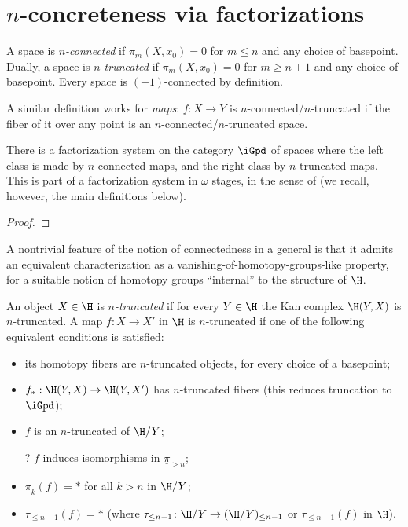 \documentclass[12pt]{amsart}
\begin{document}
\section{$n$-concreteness via factorizations}
\begin{definition}
A space is \emph{$n$-connected} if $\pi_m(X,x_0) = 0$ for $m\le n$ and any choice of basepoint. Dually, a space is \emph{$n$-truncated} if $\pi_m(X,x_0) = 0$ for $m\ge n+1$ and any choice of basepoint. Every space is $(-1)$-connected by definition.

A similar definition works for \emph{maps}: $f \colon X \to Y$ is $n$-connected\fshyp{}$n$-truncated if the fiber of it over any point is an $n$-connected\fshyp{}$n$-truncated space.
\end{definition}
\begin{proposition}
There is a factorization system on the category $\iGpd$ of spaces where the left class is made by $n$-connected maps, and the right class by $n$-truncated maps. This is part of a factorization system in $\omega$ stages, in the sense of \cite[\adef \textbf{1.5.10}]{tstructures} (we recall, however, the main definitions below).
\end{proposition}
\begin{proof}

\end{proof}
A nontrivial feature of the notion of connectedness in a general \inftop is that it admits an equivalent characterization as a vanishing-of-homotopy-groups-like property, for a suitable notion of homotopy groups ``internal'' to the structure of $\H$. 
\begin{definition}
An object $X\in\H$ is \emph{$n$-truncated} if for every $Y\in\H$ the Kan complex $\H(Y,X)$ is $n$-truncated. A map $f : X \to X'$ in $\H$ is $n$-truncated if one of the following equivalent conditions is satisfied:
\begin{itemize}
	\item its homotopy fibers are $n$-truncated objects, for every choice of a basepoint;
	\item $f_* : \H(Y,X) \to \H(Y,X')$ has $n$-truncated fibers (this reduces truncation to $\iGpd$);
	\item $f$ is an $n$-truncated of $\H/Y$;
	\item[?] $f$ induces isomorphisms in $\underline{\pi}_{>n}$;
	\item $\underline{\pi}_k(f) = *$ for all $k>n$ in $\H/Y$;
	\item $\tau_{\le n-1}(f) = *$ (where $\tau_{\le n-1} \colon \H/Y \to (\H/Y)_{\le n-1}$ or $\tau_{\le n-1}(f)$ in $\H$).
\end{itemize}
\end{definition}
\end{document}
